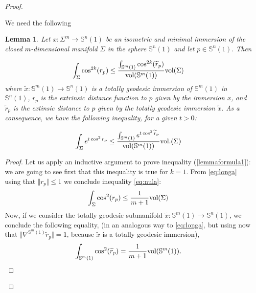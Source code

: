 \documentclass{amsart}
\newtheorem{lemma}[theorem]{Lemma}
\theoremstyle{definition}
\theoremstyle{remark}
\newcommand{\ese}{\mathbb{S}}
\providecommand{\DIFadd}[1]{{\protect\color{blue}\uwave{#1}}} %
\providecommand{\DIFdel}[1]{{\protect\color{red}\sout{#1}}}                      %
\providecommand{\DIFaddbegin}{} %
\providecommand{\DIFaddend}{} %
\providecommand{\DIFdelbegin}{} %
\providecommand{\DIFdelend}{} %
\begin{document}
\begin{proof}\

We need the following 

\begin{lemma}\DIFaddbegin \label{keylemaimm}
\DIFaddend Let  $x: \Sigma^m \to \mathbb{S}^n(1)$ be an isometric and minimal immersion of the closed $m$-dimensional manifold $\Sigma$ in the sphere  $\mathbb{S}^n(1)$ and let $p\in \mathbb{S}^n(1)$. Then

\begin{equation}\label{lemmaformula1}
\int_\Sigma \cos^{2k}(r_p) \leq \frac{\int_{\mathbb{S}^m(1)} \cos^{2k}(\widetilde{r}_p)}{{\rm vol}(\mathbb{S}^m(1))} {\rm vol}(\Sigma)
\end{equation}
where  $\widetilde{x}: \mathbb{S}^m(1) \rightarrow \mathbb{S}^n(1)$ is a totally geodesic immersion of $\ese^m(1)$ in $\ese^n(1)$, $r_p$ is the extrinsic distance function to $p$ given by the immersion $x$, and $\widetilde{r}_p$ is the extinsic distance to $p$ given by the totally geodesic immersion $\widetilde{x}$. As a consequence, we have the following inequality,  for a given $t>0$:

\begin{equation}\label{lemmaformula2}
\int_{\Sigma} e^{t \cos^2r_p}  \leq\frac{\int_{\ese^m(1)} e^{t \cos^2\widetilde{r}_p}}{{\rm vol}(\mathbb{S}^m(1))} {\rm vol}.(\Sigma)
\end{equation}
\end{lemma}
\begin{proof}

Let us apply an inductive argument to prove inequality (\ref{lemmaformula1}): we are going to see first that this inequality is true for $k=1$.  From \eqref{eq:longa} using that \DIFdelbegin \DIFdel{$\Vert r_p\Vert\leq 1$ }\DIFdelend \DIFaddbegin \DIFadd{$\Vert \nabla^\Sigma r_p\Vert\leq 1$ }\DIFaddend we conclude inequality \eqref{eq:nula}:
$$
\int_\Sigma \cos^2(r_p) \leq \frac{1}{m+1} {\rm vol}(\Sigma)
$$
Now, if we consider the totally geodesic submanifold $\widetilde{x}: \mathbb{S}^m(1) \rightarrow \mathbb{S}^n(1)$, we conclude the following equality, (in an analogous way  to \eqref{eq:longa}, but using now that $\Vert\nabla^{\mathbb{S}^m(1)} \widetilde{r}_p\Vert=1$, because $\widetilde{x}$ is a totally geodesic immersion), 
\begin{equation}\label{eqcinc}
\int_{\mathbb{S}^m(1)} \cos^2(\widetilde{r}_p) = \frac{1}{m+1} {\rm vol}(\mathbb{S}^m(1)).
\end{equation}


\end{proof}
\end{proof}
\end{document}
